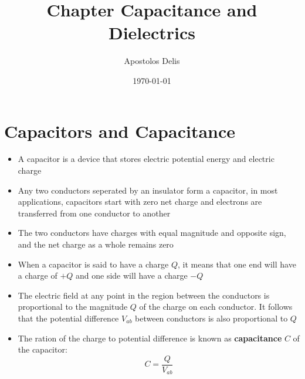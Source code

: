 \documentclass[11pt, a4paper]{article}
\begin{document}
\title{Chapter Capacitance and Dielectrics}
\author{Apostolos Delis}
\date{\today}
\maketitle

\tableofcontents
\section[24.1, Capacitors and Capacitance]{Capacitors and Capacitance}
\begin{itemize}
    \item A capacitor is a device that stores electric potential energy and electric charge
    \item Any two conductors seperated by an insulator form a capacitor, in most
        applications, capacitors start with zero net charge and electrons are transferred
        from one conductor to another
    \item The two conductors have charges with equal magnitude and opposite sign, and the
        net charge as a whole remains zero
    \item When a capacitor is said to have a charge $Q$, it means that one end will have
        a charge of $+Q$ and one side will have a charge $-Q$
    \item The electric field at any point in the region between the conductors is
        proportional to the magnitude $Q$ of the charge on each conductor. It follows
        that the potential difference $V_{ab}$ between conductors is also proportional to
        $Q$
    \item The ration of the charge to potential difference is known as
        \textbf{capacitance} $C$ of the capacitor:
        \begin{equation}
            C = \frac{Q}{V_{ab}}
        \end{equation}
\end{itemize}
\end{document}
